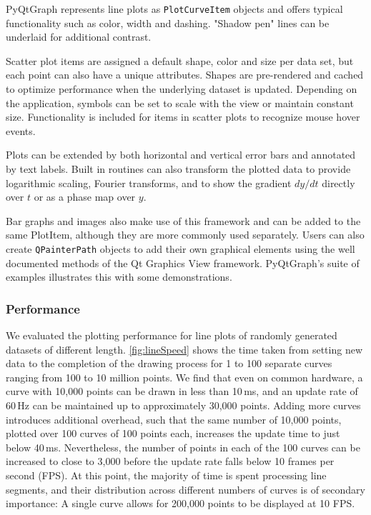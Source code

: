 PyQtGraph represents line plots as \texttt{PlotCurveItem} objects and offers typical functionality such as color, width and dashing. "Shadow pen" lines can be underlaid for additional contrast. 

Scatter plot items are assigned a default shape, color and size per data set, but each point can also have a unique attributes. Shapes are pre-rendered and cached to optimize performance when the underlying dataset is updated. Depending on the application, symbols can be set to scale with the view or maintain constant size.  Functionality is included for items in scatter plots to recognize mouse hover events.

Plots can be extended by both horizontal and vertical error bars and annotated by text labels. Built in routines can also transform the plotted data to provide logarithmic scaling, Fourier transforms, and to show the gradient $dy/dt$ directly over $t$ or as a phase map over $y$.

Bar graphs and images also make use of this framework and can be added to the same PlotItem, although they are more commonly used separately. Users can also create \texttt{QPainterPath} objects to add their own graphical elements using the well documented methods of the Qt Graphics View framework. PyQtGraph's suite of examples\cite{pg_examples} illustrates this with some demonstrations.


\subsubsection{Performance}

We evaluated the plotting performance for line plots of randomly generated datasets of different length. \autoref{fig:lineSpeed} shows the time taken from setting new data to the completion of the drawing process for 1 to 100 separate curves ranging from 100 to 10 million points. We find that even on common hardware, a curve with 10,000 points can be drawn in less than 10\,ms, and an update rate of 60\,Hz can be maintained up to approximately 30,000 points. Adding more curves introduces additional overhead, such that the same number of 10,000 points, plotted over 100 curves of 100 points each, increases the update time to just below 40\,ms. Nevertheless, the number of points in each of the 100 curves can be increased to close to 3,000 before the update rate falls below 10 frames per second (FPS). At this point, the majority of time is spent processing line segments, and their distribution across different numbers of curves is of secondary importance: A single curve allows for 200,000 points to be displayed at 10 FPS. 

